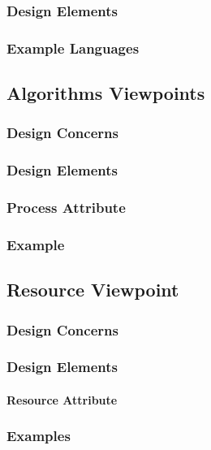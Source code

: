\documentclass[letterpaper,10pt,titlepage,draftclsnofoot,onecolumn,onesided] {IEEEtran}
\begin{document}
\subsubsection{Design Elements}
\subsubsection{Example Languages}

\subsection{Algorithms Viewpoints}
\subsubsection{Design Concerns}
\subsubsection{Design Elements}
\subsubsection{Process Attribute}
\subsubsection{Example}

\subsection{Resource Viewpoint}
\subsubsection{Design Concerns}
\subsubsection{Design Elements}
\paragraph{Resource Attribute}
\subsubsection{Examples}




\pagebreak


\end{document}
